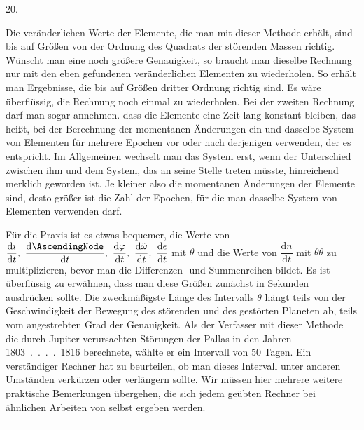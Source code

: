 \par{}\bigskip
{}
\begin{center}20.\end{center}
\begingroup
\setlength{\lineskip}{4pt}\setlength{\lineskiplimit}{4pt}
\noindent\hspace*{\parindent}Die veränderlichen Werte der Elemente, die man mit dieser Methode erhält, sind bis auf Größen von der Ordnung des Quadrats der störenden Massen richtig. Wünscht man eine noch größere Genauigkeit, so braucht man dieselbe Rechnung nur mit den eben gefundenen veränderlichen Elementen zu wiederholen. So erhält man Ergebnisse, die bis auf Größen dritter Ordnung richtig sind. Es wäre überflüssig, die Rechnung noch einmal zu wiederholen. Bei der zweiten Rechnung darf man sogar annehmen. dass die Elemente eine Zeit lang konstant bleiben, das heißt, bei der Berechnung der momentanen Änderungen ein und dasselbe System von Elementen für mehrere Epochen vor oder nach derjenigen verwenden, der es entspricht. Im Allgemeinen wechselt man das System erst, wenn der Unterschied zwischen ihm und dem System, das an seine Stelle treten müsste, hinreichend merklich geworden ist. Je kleiner also die momentanen Änderungen der Elemente sind, desto größer ist die Zahl der Epochen, für die man dasselbe System von Elementen verwenden darf.
\par Für die Praxis ist es etwas bequemer, die Werte von \(\dfrac{\mathrm{d}i}{\mathrm{d}t},\ \dfrac{\mathrm{d}\AscendingNode}{\mathrm{d}t},\ \dfrac{\mathrm{d}\varphi}{\mathrm{d}t},\ \dfrac{\mathrm{d}\tilde\omega}{\mathrm{d}t},\ \dfrac{\mathrm{d}\epsilon}{\mathrm{d}t}\) mit \(\theta\) und die Werte von \(\dfrac{\mathrm{d}n}{\mathrm{d}t}\) mit \(\theta\theta\) zu multiplizieren, bevor man die Differenzen- und Summenreihen bildet. Es ist überflüssig zu erwähnen, dass man diese Größen zunächst in Sekunden ausdrücken sollte. Die zweckmäßigste Länge des Intervalls \(\theta\) hängt teils von der Geschwindigkeit der Bewegung des störenden und des gestörten Planeten ab, teils vom angestrebten Grad der Genauigkeit. Als der Verfasser mit dieser Methode die durch Jupiter verursachten Störungen der Pallas in den Jahren \mbox{1803 . . . . 1816} berechnete, wählte er ein Intervall von 50 Tagen. Ein verständiger Rechner hat zu beurteilen, ob man dieses Intervall unter anderen Umständen verkürzen oder verlängern sollte. Wir müssen hier mehrere weitere praktische Bemerkungen übergehen, die sich jedem geübten Rechner bei ähnlichen Arbeiten von selbst ergeben werden.
\par\endgroup
\begin{center}\rule{0.18\textwidth}{0.35pt}\end{center}
